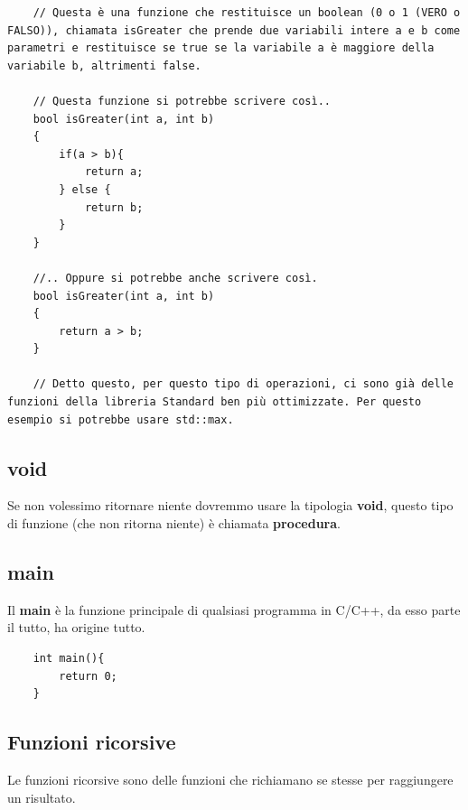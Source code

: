 \begin{lstlisting}
	// Questa è una funzione che restituisce un boolean (0 o 1 (VERO o FALSO)), chiamata isGreater che prende due variabili intere a e b come parametri e restituisce se true se la variabile a è maggiore della variabile b, altrimenti false.
	
	// Questa funzione si potrebbe scrivere così..
	bool isGreater(int a, int b)
	{
		if(a > b){
			return a;
		} else {
			return b;
		}
	}

	//.. Oppure si potrebbe anche scrivere così.
	bool isGreater(int a, int b)
	{
		return a > b;
	}

	// Detto questo, per questo tipo di operazioni, ci sono già delle funzioni della libreria Standard ben più ottimizzate. Per questo esempio si potrebbe usare std::max.
\end{lstlisting}

\subsection{void}

\textsf{\small Se non volessimo ritornare niente dovremmo usare la tipologia \textbf{void}, questo tipo di funzione (che non ritorna niente) è chiamata \textbf{procedura}.} \\

\subsection{main}

\textsf{\small Il \textbf{main} è la funzione principale di qualsiasi programma in C/C++, da esso parte il tutto, ha origine tutto.} \\

\begin{lstlisting}
	int main(){
		return 0;
	}
\end{lstlisting}

\subsection{Funzioni ricorsive}

\textsf{\small Le funzioni ricorsive sono delle funzioni che richiamano se stesse per raggiungere un risultato.} \\


